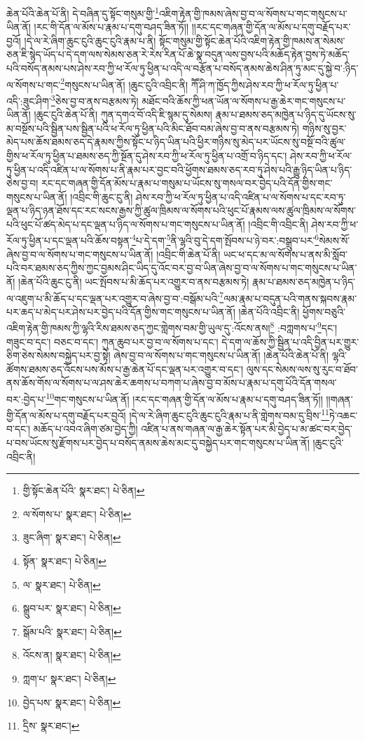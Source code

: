 ཆེན་པོའི་ཆེན་པོ་ནི། དེ་བཞིན་དུ་སྟོང་གསུམ་གྱི་\footnote{གྱི་སྟོང་ཆེན་པོའི་  སྣར་ཐང་།  པེ་ཅིན། }འཇིག་རྟེན་གྱི་ཁམས་ཞེས་བྱ་བ་ལ་སོགས་པ་གང་གསུངས་པ་ཡིན་ནོ། །རང་གི་དོན་ལ་མོས་པ་རྣམ་པ་དགུ་བཤད་ཟིན་ཏོ།། །།རང་དང་གཞན་གྱི་དོན་ལ་མོས་པ་དགུ་བརྗོད་པར་བྱའོ། །དེ་ལ་རེ་ཞིག་ཆུང་ངུའི་ཆུང་ངུའི་རྣམ་པ་ནི། སྟོང་གསུམ་གྱི་སྟོང་ཆེན་པོའི་འཇིག་རྟེན་གྱི་ཁམས་ན་སེམས་ཅན་ཇི་སྙེད་ཡོད་པ་དེ་དག་ལས་སེམས་ཅན་རེ་རེས་རིན་པོ་ཆེ་སྣ་བདུན་ལས་བྱས་པའི་མཆོད་རྟེན་བྱས་ཏེ་མཆོད་པའི་བསོད་ནམས་པས་ཤེས་རབ་ཀྱི་ཕ་རོལ་ཏུ་ཕྱིན་པ་འདི་ལ་བརྩོན་པ་བསོད་ནམས་ཆེས་ཤིན་ཏུ་མང་དུ་སྐྱེ་བ་:ཉིད་ལ་སོགས་པ་གང་\footnote{ལ་སོགས་པ་  སྣར་ཐང་།  པེ་ཅིན། }གསུངས་པ་ཡིན་ནོ། །ཆུང་ངུའི་འབྲིང་ནི། ཀཽ་ཤི་ཀ་ཁྱོད་ཀྱིས་ཤེས་རབ་ཀྱི་ཕ་རོལ་ཏུ་ཕྱིན་པ་འདི་:ཟུང་ཤིག་\footnote{ཟུང་ཞིག་  སྣར་ཐང་།  པེ་ཅིན། }ཅེས་བྱ་བ་ནས་བརྩམས་ཏེ། མཐོང་བའི་ཆོས་ཀྱི་ཕན་ཡོན་ལ་སོགས་པ་རྒྱ་ཆེར་གང་གསུངས་པ་ཡིན་ནོ། །ཆུང་ངུའི་ཆེན་པོ་ནི། ཀུན་དགའ་བོ་འདི་ཇི་སྙམ་དུ་སེམས། རྣམ་པ་ཐམས་ཅད་མཁྱེན་པ་ཉིད་དུ་ཡོངས་སུ་མ་བསྔོས་པའི་སྦྱིན་པས་སྦྱིན་པའི་ཕ་རོལ་ཏུ་ཕྱིན་པའི་མིང་ཐོབ་བམ་ཞེས་བྱ་བ་ནས་བརྩམས་ཏེ། གཉིས་སུ་བྱར་མེད་པས་ཆོས་ཐམས་ཅད་དེ་རྣམས་ཀྱིས་སྟོང་པ་ཉིད་ཡིན་པའི་ཕྱིར་གཉིས་སུ་མེད་པར་ཡོངས་སུ་བསྔོ་བའི་ཚུལ་གྱིས་ཕ་རོལ་ཏུ་ཕྱིན་པ་ཐམས་ཅད་ཀྱི་སྔོན་དུ་ཤེས་རབ་ཀྱི་ཕ་རོལ་ཏུ་ཕྱིན་པ་འགྲོ་བ་ཉིད་དང་། ཤེས་རབ་ཀྱི་ཕ་རོལ་ཏུ་ཕྱིན་པ་འདི་འཛིན་པ་ལ་སོགས་པ་ནི་རྣམ་པར་བྱང་བའི་ཕྱོགས་ཐམས་ཅད་རབ་ཏུ་ཤེས་པའི་རྒྱུ་ཉིད་ཡིན་པ་ཉིད་ཅེས་བྱ་བ། རང་དང་གཞན་གྱི་དོན་མོས་པ་རྣམ་པ་གསུམ་པ་ཡོངས་སུ་གསལ་བར་བྱེད་པའི་དོན་གྱིས་གང་གསུངས་པ་ཡིན་ནོ། །འབྲིང་གི་ཆུང་ངུ་ནི། ཤེས་རབ་ཀྱི་ཕ་རོལ་ཏུ་ཕྱིན་པ་འདི་འཛིན་པ་ལ་སོགས་པ་དང་རབ་ཏུ་ལྡན་པ་ཉིད་ཉན་ཐོས་དང་རང་སངས་རྒྱས་ཀྱི་ཚུལ་ཁྲིམས་ལ་སོགས་པའི་ཕུང་པོ་རྣམས་ལས་ཚུལ་ཁྲིམས་ལ་སོགས་པའི་ཕུང་པོ་ཚད་མེད་པ་དང་ལྡན་པ་ཉིད་ལ་སོགས་པ་གང་གསུངས་པ་ཡིན་ནོ། །འབྲིང་གི་འབྲིང་ནི། ཤེས་རབ་ཀྱི་ཕ་རོལ་ཏུ་ཕྱིན་པ་དང་ལྡན་པའི་ཆོས་བསྟན་\footnote{སྟོན་  སྣར་ཐང་།  པེ་ཅིན། }པ་དེ་དག་\footnote{ལ་  སྣར་ཐང་།  པེ་ཅིན། }ནི་ལྷའི་བུ་དེ་དག་སྤོབས་པ་ཉེ་བར་:བསྒྲུབ་པར་\footnote{སྒྲུབ་པར་  སྣར་ཐང་།  པེ་ཅིན། }སེམས་སོ་ཞེས་བྱ་བ་ལ་སོགས་པ་གང་གསུངས་པ་ཡིན་ནོ། །འབྲིང་གི་ཆེན་པོ་ནི། ཡང་ཕ་དང་མ་ལ་སོགས་པ་ནས་མི་སློབ་པའི་བར་ཐམས་ཅད་ཀྱིས་ཀྱང་བྱམས་ཤིང་ཡིད་དུ་འོང་བར་བྱ་བ་ཡིན་ཞེས་བྱ་བ་ལ་སོགས་པ་གང་གསུངས་པ་ཡིན་ནོ། །ཆེན་པོའི་ཆུང་ངུ་ནི། ཡང་སྤོབས་པ་མི་ཆོད་པར་འགྱུར་བ་ནས་བརྩམས་ཏེ། རྣམ་པ་ཐམས་ཅད་མཁྱེན་པ་ཉིད་ལ་འཇུག་པ་མི་ཆོད་པ་དང་ལྡན་པར་འགྱུར་བ་ཞེས་བྱ་བ་:བསྒོམ་པའི་\footnote{སྒོམ་པའི་  སྣར་ཐང་།  པེ་ཅིན། }ལམ་རྣམ་པ་བདུན་པའི་གནས་སྐབས་རྣམ་པར་ཆད་པ་མེད་པར་ཤེས་པར་བྱེད་པའི་དོན་གྱིས་གང་གསུངས་པ་ཡིན་ནོ། །ཆེན་པོའི་འབྲིང་ནི། ཕྱོགས་བཅུའི་འཇིག་རྟེན་གྱི་ཁམས་ཀྱི་ལྷའི་རིས་ཐམས་ཅད་ཀྱང་གླེགས་བམ་གྱི་ཡུལ་དུ་:འོངས་ནས།\footnote{འོངས་ན།  སྣར་ཐང་།  པེ་ཅིན། } :བཀླགས་པ་\footnote{ཀླག་པ་  སྣར་ཐང་།  པེ་ཅིན། }དང་། གཟུང་བ་དང་། བཅང་བ་དང་། ཀུན་ཆུབ་པར་བྱ་བ་ལ་སོགས་པ་དང་། དེ་དག་ལ་ཆོས་ཀྱི་སྦྱིན་པ་འདི་བྱིན་པར་གྱུར་ཅིག་ཅེས་སེམས་བསྐྱེད་པར་བྱ་སྟེ། ཞེས་བྱ་བ་ལ་སོགས་པ་གང་གསུངས་པ་ཡིན་ནོ། །ཆེན་པོའི་ཆེན་པོ་ནི། ལྷའི་ཚོགས་ཐམས་ཅད་འོངས་པས་མོས་པ་རྒྱ་ཆེན་པོ་དང་ལྡན་པར་འགྱུར་བ་དང་། ལུས་དང་སེམས་ལས་སུ་རུང་བ་ཐོབ་ནས་ཆོས་གོས་ལ་སོགས་པ་ལ་ཤས་ཆེར་ཆགས་པ་བཀག་པ་ཞེས་བྱ་བ་མོས་པ་རྣམ་པ་དགུ་པོའི་དོན་གསལ་བར་:བྱེད་པ་\footnote{བྱེད་པས་  སྣར་ཐང་།  པེ་ཅིན། }གང་གསུངས་པ་ཡིན་ནོ། །རང་དང་གཞན་གྱི་དོན་ལ་མོས་པ་རྣམ་པ་དགུ་བཤད་ཟིན་ཏོ།། །།གཞན་གྱི་དོན་ལ་མོས་པ་དགུ་བརྗོད་པར་བྱའོ། །དེ་ལ་རེ་ཞིག་ཆུང་ངུའི་ཆུང་ངུའི་རྣམ་པ་ནི་གླེགས་བམ་དུ་བྲིས་\footnote{དྲིས་  སྣར་ཐང་། }ཏེ་འཆང་བ་དང་། མཆོད་པ་འབའ་ཞིག་ཙམ་བྱེད་ཀྱི། འཛིན་པ་ནས་གཞན་ལ་རྒྱ་ཆེར་སྟོན་པར་མི་བྱེད་པ་མ་ཚང་བར་བྱེད་པ་བས་ཡོངས་སུ་རྫོགས་པར་བྱེད་པ་བསོད་ནམས་ཆེས་མང་དུ་བསྐྱེད་པར་གང་གསུངས་པ་ཡིན་ནོ། །ཆུང་ངུའི་འབྲིང་ནི། 